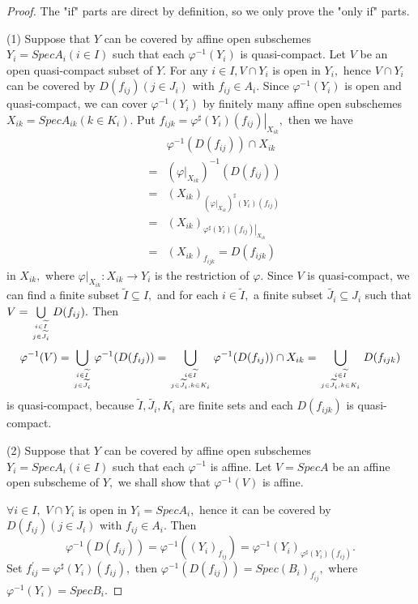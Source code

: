\begin{proof}
The "if" parts are direct by definition, so we only prove the "only
if" parts.
\enum
\item[(1)]Suppose that $Y$ can be covered by affine open subschemes
$Y_i=SpecA_i(i\in I)$ such that each $\varphi^{-1}(Y_i)$ is
quasi-compact. Let $V$ be an open quasi-compact subset of $Y.$ For
any $i\in I, V\cap Y_i$ is open in $Y_i,$ hence $V\cap Y_i$ can be
covered by $D(f_{ij})(j\in J_i)$ with $f_{ij}\in A_i.$ Since
$\varphi^{-1}(Y_i)$ is open and quasi-compact, we can cover
$\varphi^{-1}(Y_i)$ by finitely many affine open subschemes
$X_{ik}=SpecA_{ik}(k\in K_i).$ Put
$f_{ijk}=\left.\varphi^{\sharp}(Y_i)(f_{ij})\right|_{X_{ik}},$ then
we have
\begin{eqnarray*}
& & \varphi^{-1}(D(f_{ij}))\cap X_{ik} \\
& = & (\left.\varphi\right|_{X_{ik}})^{-1}(D(f_{ij}))                  \\
& = & (X_{ik})_{(\left.\varphi\right|_{X_{ik}})^{\sharp}(Y_i)(f_{ij})} \\
& = & (X_{ik})_{\left.\varphi^{\sharp}(Y_i)(f_{ij})\right|_{X_{ik}}}   \\
& = & (X_{ik})_{f_{ijk}}=D(f_{ijk})
\end{eqnarray*}
in $X_{ik},$ where $\left.\varphi\right|_{X_{ik}}: X_{ik}\rightarrow
Y_i$ is the restriction of $\varphi.$ Since $V$ is quasi-compact, we
can find a finite subset $\widetilde{I}\subseteq I,$ and for each
$i\in\widetilde{I},$ a finite subset $\widetilde{J_i}\subseteq J_i$
such that $V=\bigcup\limits_{i\in\widetilde{I} \atop
j\in\widetilde{J_i}}D(f_{ij}).$ Then
$$\varphi^{-1}(V)=\bigcup\limits_{i\in\widetilde{I} \atop j\in\widetilde{J_i}}\varphi^{-1}(D(f_{ij}))
=\bigcup\limits_{i\in\widetilde{I} \atop j\in\widetilde{J_i}, k\in
K_i}\varphi^{-1}(D(f_{ij}))\cap
X_{ik}=\bigcup\limits_{i\in\widetilde{I} \atop j\in\widetilde{J_i},
k\in K_i}D(f_{ijk})$$ is quasi-compact, because
$\widetilde{I},\widetilde{J_i},K_i$ are finite sets and each
$D(f_{ijk})$ is quasi-compact.
\item[(2)]Suppose that $Y$ can be covered by
affine open subschemes $Y_i=SpecA_i(i\in I)$ such that each
$\varphi^{-1}$ is affine. Let $V=SpecA$ be an affine open subscheme
of $Y,$ we shall show that $\varphi^{-1}(V)$ is affine.

$\forall i\in I,$ $V\cap Y_i$ is open in $Y_i=SpecA_i,$ hence it can
be covered by $D(f_{ij})(j\in J_i)$ with $f_{ij}\in A_i.$ Then
$$\varphi^{-1}(D(f_{ij}))=\varphi^{-1}((Y_i)_{f_{ij}})=\varphi^{-1}(Y_i)_{\varphi^{\sharp}(Y_i)(f_{ij})}.$$
Set $f_{ij}^{\prime}=\varphi^{\sharp}(Y_i)(f_{ij}),$ then
$\varphi^{-1}(D(f_{ij}))=Spec(B_i)_{f_{ij}^{\prime}},$ where
$\varphi^{-1}(Y_i)=SpecB_i.$


\end{proof}
